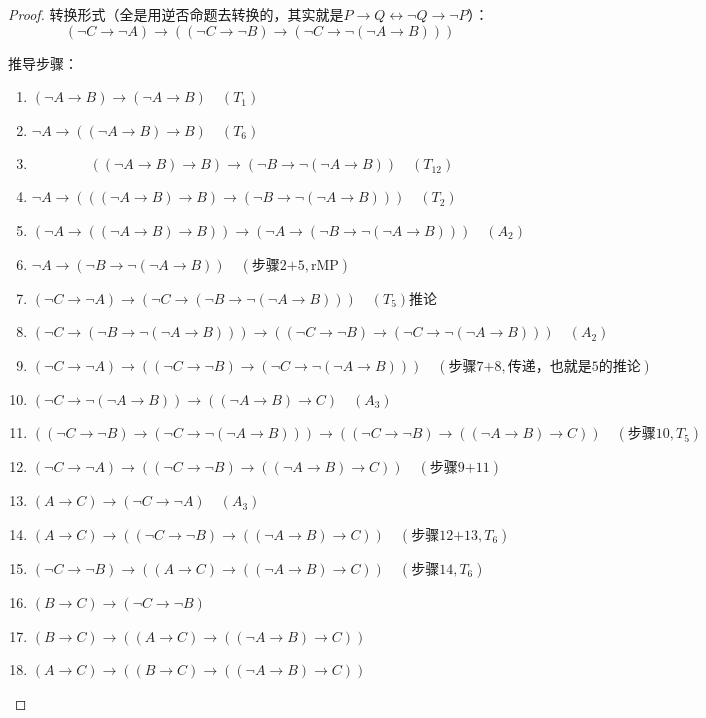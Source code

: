 \documentclass[oneside]{book}
\theoremstyle{definition}
\begin{document}
\begin{proof}
	转换形式（全是用逆否命题去转换的，其实就是\(P\to Q\leftrightarrow\neg Q\to \neg P\)）：
	\[
	(\neg C \to \neg A) \to \left( (\neg C \to \neg B) \to (\neg C \to \neg(\neg A \to B)) \right)
	\]
	
	推导步骤：
	\begin{enumerate}
		\item \( (\neg A \to B) \to (\neg A \to B) \quad (T_1) \)
		\item \( \neg A \to ((\neg A \to B) \to B) \quad (T_6) \)
		\item 
		\[
		((\neg A \to B) \to B) \to (\neg B \to \neg (\neg A \to B)) \quad (T_{12})
		\]
		\item \( \neg A \to \left( ((\neg A \to B) \to B) \to (\neg B \to \neg (\neg A \to B)) \right) \quad (T_2) \)
		\item \( \left( \neg A \to ((\neg A \to B) \to B) \right) \to \left( \neg A \to (\neg B \to \neg (\neg A \to B)) \right) \quad (A_2) \)
		\item \( \neg A \to (\neg B \to \neg (\neg A \to B)) \quad (\text{步骤2+5}, \text{rMP}) \)
		\item \( (\neg C \to \neg A) \to \left( \neg C \to (\neg B \to \neg (\neg A \to B)) \right) \quad (T_5)\text{推论} \)
		\item \( (\neg C \to (\neg B \to \neg (\neg A \to B))) \to \left( (\neg C \to \neg B) \to (\neg C \to \neg (\neg A \to B)) \right) \quad (A_2) \)
		\item \( (\neg C \to \neg A) \to \left( (\neg C \to \neg B) \to (\neg C \to \neg (\neg A \to B)) \right) \quad (\text{步骤7+8}, \text{传递，也就是5的推论}) \)
		\item \( (\neg C \to \neg (\neg A \to B)) \to ((\neg A \to B) \to C) \quad (A_3) \)
		\item \( \left( (\neg C \to \neg B) \to (\neg C \to \neg (\neg A \to B)) \right) \to \left( (\neg C \to \neg B) \to ((\neg A \to B) \to C) \right) \quad (\text{步骤10}, T_5) \)
		\item \( (\neg C \to \neg A) \to \left( (\neg C \to \neg B) \to ((\neg A \to B) \to C) \right) \quad (\text{步骤9+11}) \)
		\item \( (A \to C) \to (\neg C \to \neg A) \quad (A_3) \)
		\item \( (A \to C) \to \left( (\neg C \to \neg B) \to ((\neg A \to B) \to C) \right) \quad (\text{步骤12+13}, T_6) \)
		\item \( (\neg C \to \neg B) \to \left( (A \to C) \to ((\neg A \to B) \to C) \right) \quad (\text{步骤14}, T_6) \)
		\item \( (B \to C) \to (\neg C \to \neg B) \)
		\item \( (B \to C) \to \left( (A \to C) \to ((\neg A \to B) \to C) \right) \)
		\item \( (A \to C) \to \left( (B \to C) \to ((\neg A \to B) \to C) \right) \)
	\end{enumerate}
\end{proof}
\end{document}
